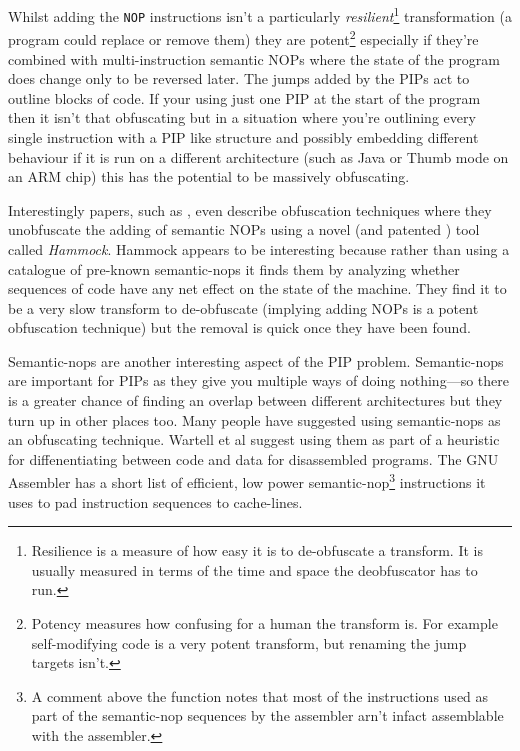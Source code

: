 \documentclass[]{book}
\begin{document}
Whilst adding the \lstinline!NOP! instructions isn't a particularly
\emph{resilient}\footnote{Resilience is a measure of how easy it is to
  de-obfuscate a transform. It is usually measured in terms of the time
  and space the deobfuscator has to run.} transformation (a program
could replace or remove them) they are potent\footnote{Potency measures
  how confusing for a human the transform is. For example self-modifying
  code is a very potent transform, but renaming the jump targets isn't.}
especially if they're combined with multi-instruction semantic NOPs
where the state of the program does change only to be reversed later.
The jumps added by the PIPs act to outline blocks of code. If your using
just one PIP at the start of the program then it isn't that obfuscating
but in a situation where you're outlining every single instruction with
a PIP like structure and possibly embedding different behaviour if it is
run on a different architecture (such as Java or Thumb mode on an ARM
chip) this has the potential to be massively obfuscating.

Interestingly papers, such as
\autocite{Christodorescu:2005vh}\autocite{Christodorescu:2005vf}, even
describe obfuscation techniques where they unobfuscate the adding of
semantic NOPs using a novel (and patented
\autocite{Christodorescu:2009wo}) tool called \emph{Hammock}. Hammock
appears to be interesting because rather than using a catalogue of
pre-known semantic-nops it finds them by analyzing whether sequences of
code have any net effect on the state of the machine. They find it to be
a very slow transform to de-obfuscate (implying adding NOPs is a potent
obfuscation technique) but the removal is quick once they have been
found.

Semantic-nops are another interesting aspect of the PIP problem.
Semantic-nops are important for PIPs as they give you multiple ways of
doing nothing---so there is a greater chance of finding an overlap
between different architectures but they turn up in other places too.
Many people
\autocite{Christodorescu:2005vh}\autocite{Owens:2011um}\autocite{Bruschi:2007dn}
have suggested using semantic-nops as an obfuscating technique. Wartell
et al suggest using them as part of a heuristic for diffenentiating
between code and data for disassembled
programs\autocite{Wartell:2011ji}. The GNU Assembler has a short list of
efficient, low power semantic-nop\footnote{A comment above the
  function\autocite{Anonymous:td} notes that most of the instructions
  used as part of the semantic-nop sequences by the assembler arn't
  infact assemblable with the assembler.} instructions it uses to pad
instruction sequences to cache-lines\autocite{Anonymous:td}.
\end{document}
